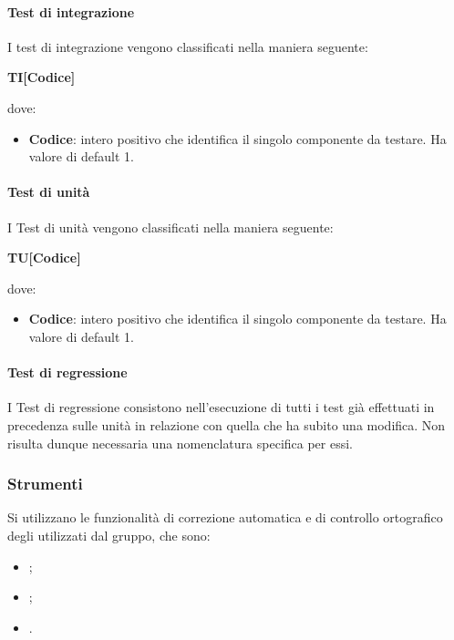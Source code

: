 		\paragraph{Test di integrazione}
		I test di integrazione vengono classificati nella maniera seguente:
		\begin{center}
			\textbf{TI[Codice]}
		\end{center}	
		dove:\\
		\begin{itemize}
			\item \textbf{Codice}: intero positivo che identifica il singolo componente da testare. Ha valore di default 1.
		\end{itemize}		 
		
		\paragraph{Test di unità}
		I Test di unità vengono classificati nella maniera seguente:
		\begin{center}
			\textbf{TU[Codice]}
		\end{center}		
		dove:\\
		\begin{itemize}
			\item \textbf{Codice}: intero positivo che identifica il singolo componente da testare. Ha valore di default 1.
		\end{itemize}
		
		\paragraph{Test di regressione}
		I Test di regressione consistono nell'esecuzione di tutti i test già effettuati in precedenza sulle unità in relazione con quella che ha subito una modifica. Non risulta dunque necessaria una nomenclatura specifica per essi.
		
		\subsubsection{Strumenti}
		Si utilizzano le funzionalità di correzione automatica e di controllo ortografico degli  utilizzati dal gruppo, che sono:
		\begin{itemize}
			\item {};
			\item {};
			\item {}.
		\end{itemize}
